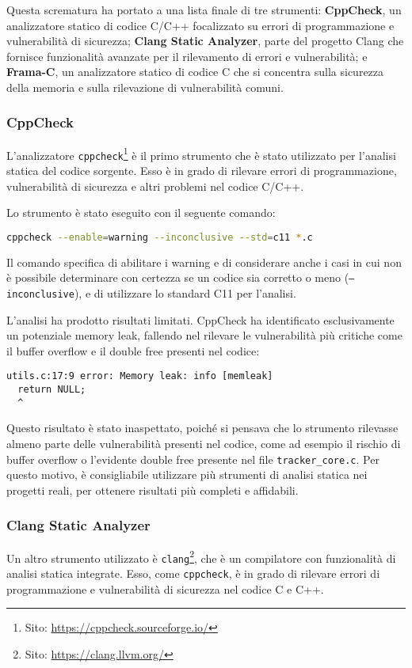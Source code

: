 Questa scrematura ha portato a una lista finale di tre strumenti: \textbf{CppCheck},
un analizzatore statico di codice C/C++ focalizzato su errori di programmazione e
vulnerabilità di sicurezza; \textbf{Clang Static Analyzer}, parte del progetto
Clang che fornisce funzionalità avanzate per il rilevamento di errori e
vulnerabilità; e \textbf{Frama-C}, un analizzatore statico di codice C che si concentra
sulla sicurezza della memoria e sulla rilevazione di vulnerabilità comuni.

\subsubsection*{CppCheck}
L'analizzatore \texttt{cppcheck}\footnote{Sito: \url{https://cppcheck.sourceforge.io/}}
è il primo strumento che è stato utilizzato per l'analisi statica del codice sorgente.
Esso è in grado di rilevare errori di programmazione, vulnerabilità di sicurezza
e altri problemi nel codice C/C++.

Lo strumento è stato eseguito con il seguente comando:
\begin{lstlisting}[language=bash, numbers=none]
cppcheck --enable=warning --inconclusive --std=c11 *.c
\end{lstlisting}
Il comando specifica di abilitare i warning e di considerare anche i casi in cui
non è possibile determinare con certezza se un codice sia corretto o meno (\texttt{--inconclusive}),
e di utilizzare lo standard C11 per l'analisi.

L'analisi ha prodotto risultati limitati. CppCheck ha identificato esclusivamente
un potenziale memory leak, fallendo nel rilevare le vulnerabilità più critiche
come il buffer overflow e il double free presenti nel codice:

\begin{lstlisting}[language={}, numbers=none]
utils.c:17:9 error: Memory leak: info [memleak]
  return NULL;
  ^
\end{lstlisting}

Questo risultato è stato inaspettato, poiché si pensava che lo strumento
rilevasse almeno parte delle vulnerabilità presenti nel codice, come ad esempio il
rischio di buffer overflow o l'evidente double free presente nel file \texttt{tracker\_core.c}.
Per questo motivo, è consigliabile utilizzare più strumenti di analisi statica
nei progetti reali, per ottenere risultati più completi e affidabili.

\subsubsection*{Clang Static Analyzer}
Un altro strumento utilizzato è \texttt{clang}\footnote{Sito: \url{https://clang.llvm.org/}},
che è un compilatore con funzionalità di analisi statica integrate. Esso, come
\texttt{cppcheck}, è in grado di rilevare errori di programmazione e
vulnerabilità di sicurezza nel codice C e C++.

